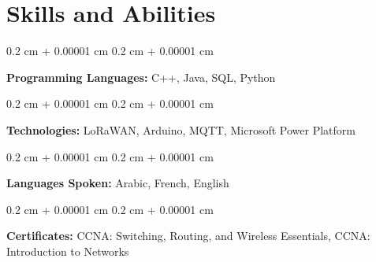 \documentclass[10pt, letterpaper]{article}
\newenvironment{onecolentry}{
    \begin{adjustwidth}{
        0.2 cm + 0.00001 cm
    }{
        0.2 cm + 0.00001 cm
    }
}{
    \end{adjustwidth}
} %
\begin{document}
        \vspace{0.2 cm}



    
    \section{Skills and Abilities}



        
        \begin{onecolentry}
            \textbf{Programming Languages:} C++, Java, SQL, Python
        \end{onecolentry}

        \vspace{0.1 cm}

        \begin{onecolentry}
            \textbf{Technologies:} LoRaWAN, Arduino, MQTT,  Microsoft Power Platform
        \end{onecolentry}
        \vspace{0.1 cm}
        \begin{onecolentry}
            \textbf{Languages Spoken:} Arabic, French, English
        \end{onecolentry}
        \vspace{0.1 cm}
        \begin{onecolentry}
            \textbf{Certificates:} CCNA: Switching, Routing, and Wireless Essentials, CCNA: Introduction to Networks
        \end{onecolentry}





    
\end{document}
